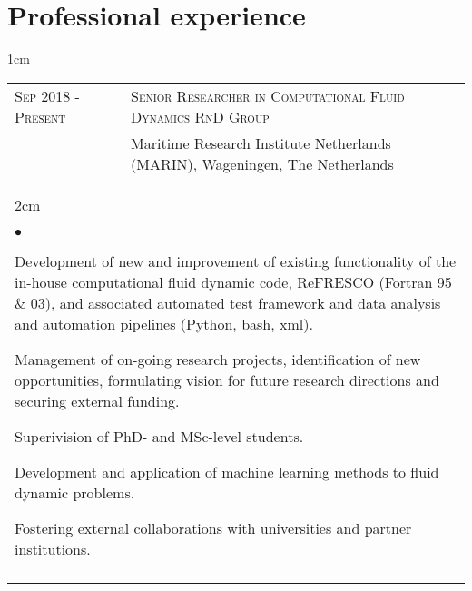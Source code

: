 \documentclass[a4paper,10pt]{article}
\newcommand{\squishlist}{
	\begin{list}{$\bullet$}
	{
		\setlength{\itemsep}{0pt}
		\setlength{\parsep}{0pt}
		\setlength{\topsep}{0pt}
		\setlength{\partopsep}{0pt}
		\setlength{\leftmargin}{2em}
		\setlength{\labelwidth}{1.5em}
		\setlength{\labelsep}{0.5em}
	}
}
\newcommand{\squishend}{\end{list}}
\begin{document}
\section{Professional experience}

\begin{minipage}{\textwidth}
\begin{adjustwidth}{}{1cm}

\begin{tabular}{p{3.5cm} p{12.9cm}}


\textsc{Sep 2018 - Present} & \textsc{Senior Researcher in Computational Fluid Dynamics RnD Group} \\
							& Maritime Research Institute Netherlands (MARIN), Wageningen, The Netherlands \vspace{0.1cm} \\
%
\multicolumn{2}{l}{
\hspace{1cm}\begin{minipage}[t]{\textwidth}
\begin{adjustwidth}{}{2cm}
\squishlist
	\item Development of new and improvement of existing functionality of the in-house
		computational fluid dynamic code, ReFRESCO (Fortran 95 \& 03), and associated automated test framework and data analysis and automation pipelines (Python, bash, xml).
	\item Management of on-going research projects, identification of new opportunities, formulating vision for future research directions and securing external funding.
	\item Superivision of PhD- and MSc-level students.
	\item Development and application of machine learning methods to fluid dynamic problems.
    \item Fostering external collaborations with universities and partner institutions.
\squishend
\end{adjustwidth}
\end{minipage}
} \\
\\


\end{tabular}
\end{adjustwidth}
\end{minipage}
\end{document}
